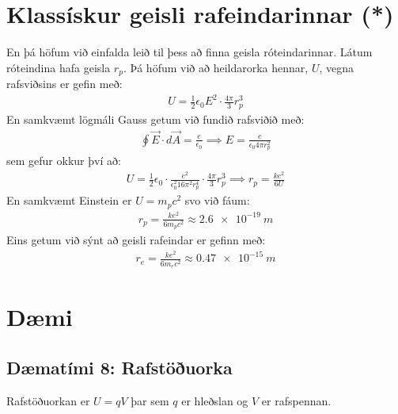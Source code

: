 \section{Klassískur geisli rafeindarinnar (*)}

En þá höfum við einfalda leið til þess að finna geisla róteindarinnar. Látum róteindina hafa geisla $r_p$. Þá höfum við að heildarorka hennar, $U$, vegna rafsviðsins er gefin með:
\begin{align*}
    U = \frac{1}{2}\epsilon_0 E^2 \cdot \frac{4\pi}{3} r_p^3
\end{align*}
En samkvæmt lögmáli Gauss getum við fundið rafsviðið með:
\begin{align*}
    \oint \Vec{E} \cdot d\Vec{A} = \frac{e}{\epsilon_0} \implies E = \frac{e}{\epsilon_0 4\pi r_p^2}
\end{align*}
sem gefur okkur því að:
\begin{align*}
    U = \frac{1}{2} \epsilon_0 \cdot \frac{e^2}{\epsilon_0^2 16\pi^2 r_p^4} \cdot \frac{4\pi}{3} r_p^3 \implies r_p = \frac{ke^2}{6 U}
\end{align*}
En samkvæmt Einstein er $U = m_p c^2$ svo við fáum:
\begin{align*}
    r_p = \frac{ke^2}{6m_p c^2} \approx \SI{2.6e-19}{m}
\end{align*}
Eins getum við sýnt að geisli rafeindar er gefinn með:
\begin{align*}
    r_e = \frac{ke^2}{6 m_e c^2} \approx \SI{0.47e-15}{m}
\end{align*}

\newpage

\section{Dæmi}


\subsection*{Dæmatími 8: Rafstöðuorka}

\begin{tcolorbox}
Rafstöðuorkan er $U = qV$ þar sem $q$ er hleðslan og $V$ er rafspennan.
\end{tcolorbox}

